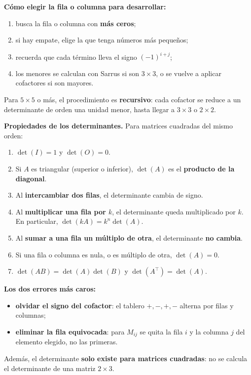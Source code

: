 \documentclass[12pt, letterpaper]{article}
\begin{document}
\begin{cuadropasos}
  \small
  \textbf{Cómo elegir la fila o columna para desarrollar:}
  \begin{enumerate}[leftmargin=1.4em, nosep]
    \item busca la fila o columna con \textbf{más ceros};
    \item si hay empate, elige la que tenga números más pequeños;
    \item recuerda que cada término lleva el signo $(-1)^{i+j}$;
    \item los menores se calculan con Sarrus si son $3\times3$, o se vuelve
          a aplicar cofactores si son mayores.
  \end{enumerate}
  Para $5\times5$ o más, el procedimiento es \textbf{recursivo}: cada
  cofactor se reduce a un determinante de orden una unidad menor, hasta
  llegar a $3\times3$ o $2\times2$.
\end{cuadropasos}

\begin{cuadroteoria}
  \small
  \textbf{Propiedades de los determinantes.} Para matrices cuadradas del
  mismo orden:
  \begin{enumerate}[leftmargin=1.4em, nosep]
    \item $\det(I)=1$ y $\det(O)=0$.
    \item Si $A$ es triangular (superior o inferior), $\det(A)$ es el
          \textbf{producto de la diagonal}.
    \item Al \textbf{intercambiar dos filas}, el determinante cambia de
          signo.
    \item Al \textbf{multiplicar una fila por $k$}, el determinante queda
          multiplicado por $k$. En particular,
          $\det(kA)=k^n\det(A)$.
    \item Al \textbf{sumar a una fila un múltiplo de otra}, el determinante
          \textbf{no cambia}.
    \item Si una fila o columna es nula, o es múltiplo de otra,
          $\det(A)=0$.
    \item $\det(AB)=\det(A)\det(B)$ y $\det(A^{\top})=\det(A)$.
  \end{enumerate}
\end{cuadroteoria}

\begin{cuadroadvertencia}
  \small
  \textbf{Los dos errores más caros:}
  \begin{itemize}[leftmargin=1.2em, nosep]
    \item \textbf{olvidar el signo del cofactor}: el tablero
          $+,-,+,-$ alterna por filas y columnas;
    \item \textbf{eliminar la fila equivocada}: para $M_{ij}$ se quita la
          fila $i$ y la columna $j$ del elemento elegido, no las primeras.
  \end{itemize}
  Además, el determinante \textbf{solo existe para matrices cuadradas}: no
  se calcula el determinante de una matriz $2\times3$.
\end{cuadroadvertencia}
\end{document}
